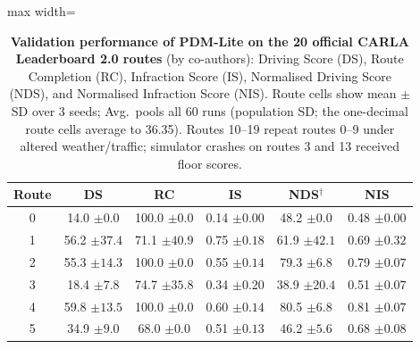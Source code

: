 \begin{table}[!tp]
  \centering
  \caption[Validation performance of PDM-Lite on the 20 CARLA Leaderboard 2.0 routes]{\textbf{Validation performance of PDM-Lite on the 20 official CARLA Leaderboard 2.0 routes} (by co-authors): Driving Score (DS), Route Completion (RC), Infraction Score (IS), Normalised Driving Score (NDS), and Normalised Infraction Score (NIS). Route cells show mean $\pm$ SD over 3 seeds; Avg.\ pools all 60 runs (population SD; the one-decimal route cells average to 36.35). Routes 10--19 repeat routes 0--9 under altered weather/traffic; simulator crashes on routes 3 and 13 received floor scores.}
  \label{drivelm:tab:pdm_results}
  \small
  \begin{adjustbox}{max width=\textwidth}
  \begin{tabular}{c|c|c|c|c|c}
    \toprule
    \textbf{Route} & \textbf{DS} & \textbf{RC} & \textbf{IS} & \textbf{NDS}$^{\dagger}$ & \textbf{NIS} \\
    \midrule
    0 & 14.0 {\color{gray}\footnotesize $\pm 0.0$} & 100.0 {\color{gray}\footnotesize $\pm 0.0$} & 0.14 {\color{gray}\footnotesize $\pm 0.00$} & 48.2 {\color{gray}\footnotesize $\pm 0.0$} & 0.48 {\color{gray}\footnotesize $\pm 0.00$} \\
    1 & 56.2 {\color{gray}\footnotesize $\pm 37.4$} & 71.1 {\color{gray}\footnotesize $\pm 40.9$} & 0.75 {\color{gray}\footnotesize $\pm 0.18$} & 61.9 {\color{gray}\footnotesize $\pm 42.1$} & 0.69 {\color{gray}\footnotesize $\pm 0.32$} \\
    2 & 55.3 {\color{gray}\footnotesize $\pm 14.3$} & 100.0 {\color{gray}\footnotesize $\pm 0.0$} & 0.55 {\color{gray}\footnotesize $\pm 0.14$} & 79.3 {\color{gray}\footnotesize $\pm 6.8$} & 0.79 {\color{gray}\footnotesize $\pm 0.07$} \\
    3 & 18.4 {\color{gray}\footnotesize $\pm 7.8$} & 74.7 {\color{gray}\footnotesize $\pm 35.8$} & 0.34 {\color{gray}\footnotesize $\pm 0.20$} & 38.9 {\color{gray}\footnotesize $\pm 20.4$} & 0.51 {\color{gray}\footnotesize $\pm 0.07$} \\
    4 & 59.8 {\color{gray}\footnotesize $\pm 13.5$} & 100.0 {\color{gray}\footnotesize $\pm 0.0$} & 0.60 {\color{gray}\footnotesize $\pm 0.14$} & 80.5 {\color{gray}\footnotesize $\pm 6.8$} & 0.81 {\color{gray}\footnotesize $\pm 0.07$} \\
    5 & 34.9 {\color{gray}\footnotesize $\pm 9.0$} & 68.0 {\color{gray}\footnotesize $\pm 0.0$} & 0.51 {\color{gray}\footnotesize $\pm 0.13$} & 46.2 {\color{gray}\footnotesize $\pm 5.6$} & 0.68 {\color{gray}\footnotesize $\pm 0.08$} \\

\end{tabular}
\end{adjustbox}
\end{table}

